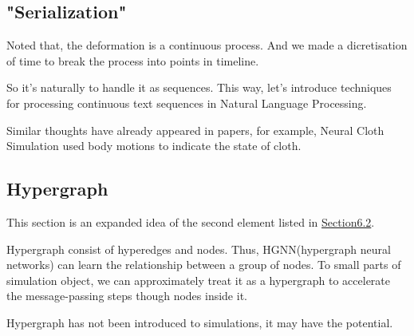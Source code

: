 \documentclass{article}
\begin{document}
\subsection{"Serialization"}
\par Noted that, the deformation is a continuous process. And we made a dicretisation of time to break the process into points in timeline.
\par So it's naturally to handle it as sequences. This way, let's introduce techniques for processing continuous text sequences in Natural Language Processing.
\par Similar thoughts have already appeared in papers, for example, Neural Cloth Simulation\cite{bertiche2022neural} used body motions to indicate the state of cloth.
\subsection{Hypergraph}
\par This section is an expanded idea of the second element listed in \href{subsection.6.2}{Section6.2}.
\par Hypergraph consist of hyperedges and nodes. Thus, HGNN(hypergraph neural networks) can learn the relationship between a group of nodes. To small parts of simulation object, we can approximately treat it as a hypergraph to accelerate the message-passing steps though nodes inside it.
\par Hypergraph has not been introduced to simulations, it may have the potential.

\newpage


\end{document}
